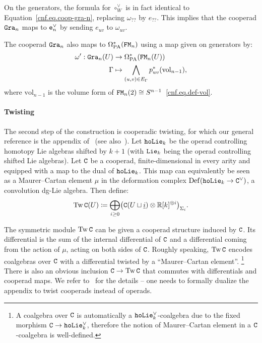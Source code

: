 On the generators, the formula for $\circ_{W}^{\vee}$ is in fact identical to Equation~\eqref{cnf.eq.coop-gra-n}, replacing $\omega_{??}$ by $e_{??}$.
This implies that the cooperad $\mathtt{Gra}_{n}$ maps to $\mathtt{e}_{n}^{\vee}$ by sending $e_{uv}$ to $\omega_{uv}$.

The cooperad $\mathtt{Gra}_{n}$ also maps to $\Omega_{\mathrm{PA}}^{*}(\mathtt{FM}_{n})$ using a map given on generators by:
\begin{align}
  \label{cnf.eq:2}
  \omega' : \mathtt{Gra}_{n}(U)
  & \to \Omega_{\mathrm{PA}}^{*}(\mathtt{FM}_{n}(U))
    \notag \\
  \Gamma
  & \mapsto \bigwedge_{(u,v) \in E_{\Gamma}} p_{uv}^{*}(\mathrm{vol}_{n-1}),
\end{align}
where $\mathrm{vol}_{n-1}$ is the volume form of $\mathtt{FM}_{n}(2) \cong S^{n-1}$~\eqref{cnf.eq.def-vol}.

\paragraph{Twisting}

The second step of the construction is cooperadic twisting, for which our general reference is the appendix of~\cite{Willwacher2016} (see also~\cite{DolgushevWillwacher2015}).
Let $\mathtt{hoLie}_{k}$ be the operad controlling homotopy Lie algebras shifted by $k+1$ (with $\mathtt{Lie}_{k}$ being the operad controlling shifted Lie algebras).
Let $\mathtt{C}$ be a cooperad, finite-dimensional in every arity and equipped with a map to the dual of $\mathtt{hoLie}_{k}$.
This map can equivalently be seen as a Maurer--Cartan element $\mu$ in the deformation complex $\operatorname{Def}(\mathtt{hoLie}_{k} \to \mathtt{C}^{\vee})$, a convolution dg-Lie algebra.
Then define:
\[ \operatorname{Tw} \mathtt{C} (U) \coloneqq \bigoplus_{i \geq 0} \bigl( \mathtt{C}(U \sqcup \underline{i}) \otimes \mathbb{R}[k]^{\otimes i} \bigr)_{\Sigma_{i}}. \]

The symmetric module $\operatorname{Tw} \mathtt{C}$ can be given a cooperad structure induced by $\mathtt{C}$.
Its differential is the sum of the internal differential of $\mathtt{C}$ and a differential coming from the action of $\mu$, acting on both sides of $\mathtt{C}$.
Roughly speaking, $\operatorname{Tw} \mathtt{C}$ encodes coalgebras over $\mathtt{C}$ with a differential twisted by a ``Maurer--Cartan element''.%
\footnote{A coalgebra over $\mathtt{C}$ is automatically a $\mathtt{hoLie}_{k}^{\vee}$-coalgebra due to the fixed morphism $\mathtt{C} \to \mathtt{hoLie}_{k}^{\vee}$, therefore the notion of Maurer--Cartan element in a $\mathtt{C}$-coalgebra is well-defined.}
There is also an obvious inclusion $\mathtt{C} \to \operatorname{Tw} \mathtt{C}$ that commutes with differentials and cooperad maps.
We refer to~\cite{Willwacher2016} for the details -- one needs to formally dualize the appendix to twist cooperads instead of operads.

